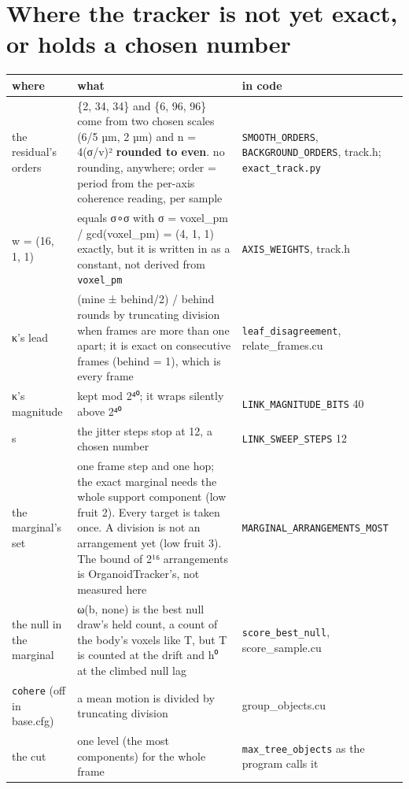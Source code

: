 \section{\texorpdfstring{Where the tracker is not yet exact, or holds a chosen number}{Where the tracker is not yet exact, or holds a chosen number}}

{\small
\setlength{\tabcolsep}{6pt}
\begin{longtable}{>{\RaggedRight\arraybackslash}p{}>{\RaggedRight\arraybackslash}p{}>{\RaggedRight\arraybackslash}p{}}
\toprule
where & what & in code \\
\midrule
\endhead
the residual's orders & \{2, 34, 34\} and \{6, 96, 96\} come from two chosen scales (6/5 µm, 2 µm) and n = 4(σ/v)² \textbf{rounded to even}. no rounding, anywhere; order = period from the per-axis coherence reading, per sample & \texttt{SMOOTH\_\allowbreak{}ORDERS}, \texttt{BACKGROUND\_\allowbreak{}ORDERS}, track.h; \texttt{exact\_\allowbreak{}track.\allowbreak{}py} \\
w = (16, 1, 1) & equals σ∘σ with σ = voxel\_\allowbreak{}pm / gcd(voxel\_\allowbreak{}pm) = (4, 1, 1) exactly, but it is written in as a constant, not derived from \texttt{voxel\_\allowbreak{}pm} & \texttt{AXIS\_\allowbreak{}WEIGHTS}, track.h \\
κ's lead & (mine ± behind/2) / behind rounds by truncating division when frames are more than one apart; it is exact on consecutive frames (behind = 1), which is every frame & \texttt{leaf\_\allowbreak{}disagreement}, relate\_\allowbreak{}frames.cu \\
κ's magnitude & kept mod 2⁴⁰; it wraps silently above 2⁴⁰ & \texttt{LINK\_\allowbreak{}MAGNITUDE\_\allowbreak{}BITS} 40 \\
s & the jitter steps stop at 12, a chosen number & \texttt{LINK\_\allowbreak{}SWEEP\_\allowbreak{}STEPS} 12 \\
the marginal's set & one frame step and one hop; the exact marginal needs the whole support component (low fruit 2). Every target is taken once. A division is not an arrangement yet (low fruit 3). The bound of 2¹⁶ arrangements is OrganoidTracker's, not measured here & \texttt{MARGINAL\_\allowbreak{}ARRANGEMENTS\_\allowbreak{}MOST} \\
the null in the marginal & ω(b, none) is the best null draw's held count, a count of the body's voxels like T, but T is counted at the drift and h⁰ at the climbed null lag & \texttt{score\_\allowbreak{}best\_\allowbreak{}null}, score\_\allowbreak{}sample.cu \\
\texttt{cohere} (off in base.cfg) & a mean motion is divided by truncating division & group\_\allowbreak{}objects.cu \\
the cut & one level (the most components) for the whole frame & \texttt{max\_\allowbreak{}tree\_\allowbreak{}objects} as the program calls it \\
\bottomrule
\end{longtable}
}

